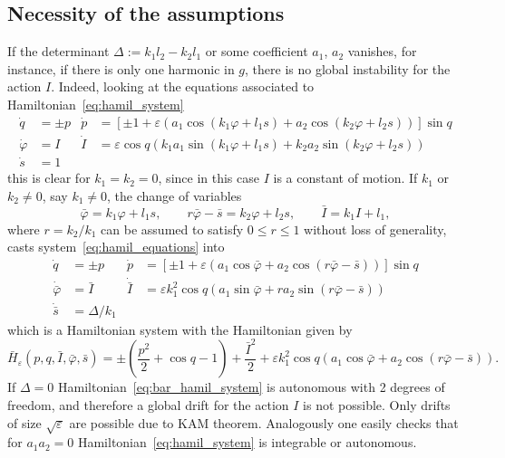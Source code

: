 \documentclass[a4paper,10pt]{article}
\theoremstyle{definition}
\begin{document}
\subsection{Necessity of the assumptions}
If the determinant $\Delta:=k_1 l_2-k_2 l_1$ or some coefficient $a_1$, $a_2$ vanishes, for instance, if there is only one harmonic in $g$, there is no
global instability for the action $I$. Indeed, looking at the equations associated to Hamiltonian~\eqref{eq:hamil_system}
\begin{align}
\label{eq:hamil_equations}
\dot{q} &= \pm p&\dot{p} &= \left[ \pm 1 + \varepsilon\left(a_1\cos(k_1\varphi + l_1 s) + a_2\cos(k_2\varphi + l_2 s)\right)\right]\sin q\nonumber \\
\dot{\varphi} &= I&\dot{I} &= \varepsilon\cos q \left(k_1 a_1\sin(k_1\varphi + l_1 s) + k_2 a_2\sin(k_2\varphi + l_2 s)\right)\\
\dot{s} &= 1\nonumber&&
\end{align}
this is clear for $k_1=k_2=0$, since in this case $I$ is a constant of motion. 
If $k_1$ or $k_2\neq 0$, say $k_1\neq 0$,
the change of variables
\begin{equation*}
\bar{\varphi} = k_1\varphi + l_1 s, \quad\quad r\bar{\varphi} - \bar{s} = k_2\varphi + l_2s, \quad\quad \bar{I}= k_1 I + l_1,
\end{equation*}
where $r = k_2/k_1$ can be assumed to satisfy $0\leq r \leq 1$ without loss of generality, casts system~\eqref{eq:hamil_equations} into
\begin{align*}
\dot{q} &=\pm p& \dot{p} &= \left[\pm 1  + \varepsilon \left( a_1 \cos\bar{\varphi} + a_2\cos(r\bar{\varphi} - \bar{s})\right)\right] \sin q\\
\dot{\bar{\varphi}} &= \bar{I}&\dot{\bar{I}} &= \varepsilon k_1^2\cos q\left(a_1\sin \bar{\varphi}  + r a_2 \sin(r\bar{\varphi} - \bar{s})\right)\\
\dot{\bar{s}} &= \Delta/k_1&&
\end{align*}
which is a Hamiltonian system with the Hamiltonian given by
\begin{equation}
\label{eq:bar_hamil_system}
\bar{H}_{\varepsilon}(p,q,\bar{I},\bar{\varphi},\bar{s}) = \pm \left(\frac{p^2}{2} + \cos q - 1 \right) + \frac{\bar{I}^2}{2} + \varepsilon k_1^2\cos q\left(a_1\cos\bar{\varphi} + a_2\cos(r\bar{\varphi} - \bar{s})\right).
\end{equation}
If $\Delta=0$ Hamiltonian~\eqref{eq:bar_hamil_system} is autonomous with 2 degrees of freedom,
and therefore a global drift for the action $I$ is not possible. Only drifts of size $\sqrt{\varepsilon}$ are possible due to KAM theorem.
Analogously one easily checks that for $a_1a_2=0$ Hamiltonian~\eqref{eq:hamil_system} is integrable or autonomous.
\end{document}
